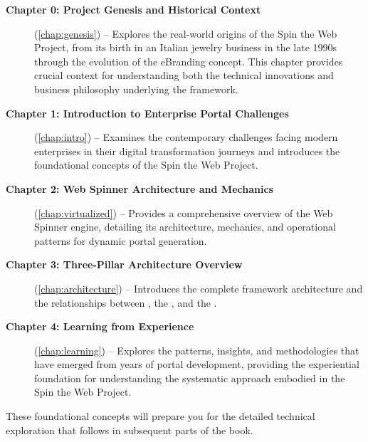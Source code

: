 \begin{description}
\item[\textbf{Chapter 0: Project Genesis and Historical Context}] (\cref{chap:genesis}) -- Explores the real-world origins of the Spin the Web Project, from its birth in an Italian jewelry business in the late 1990s through the evolution of the eBranding concept. This chapter provides crucial context for understanding both the technical innovations and business philosophy underlying the framework.

\item[\textbf{Chapter 1: Introduction to Enterprise Portal Challenges}] (\cref{chap:intro}) -- Examines the contemporary challenges facing modern enterprises in their digital transformation journeys and introduces the foundational concepts of the Spin the Web Project.

\item[\textbf{Chapter 2: Web Spinner Architecture and Mechanics}] (\cref{chap:virtualized}) -- Provides a comprehensive overview of the Web Spinner engine, detailing its architecture, mechanics, and operational patterns for dynamic portal generation.

\item[\textbf{Chapter 3: Three-Pillar Architecture Overview}] (\cref{chap:architecture}) -- Introduces the complete framework architecture and the relationships between \wbdl{}, the \webspinner{}, and the \studio{}.

\item[\textbf{Chapter 4: Learning from Experience}] (\cref{chap:learning}) -- Explores the patterns, insights, and methodologies that have emerged from years of portal development, providing the experiential foundation for understanding the systematic approach embodied in the Spin the Web Project.
\end{description}

These foundational concepts will prepare you for the detailed technical exploration that follows in subsequent parts of the book.
